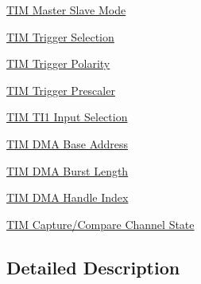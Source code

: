 \begin{DoxyCompactItemize}
\item 
\hyperlink{group___t_i_m___master___slave___mode}{T\+I\+M Master Slave Mode}
\item 
\hyperlink{group___t_i_m___trigger___selection}{T\+I\+M Trigger Selection}
\item 
\hyperlink{group___t_i_m___trigger___polarity}{T\+I\+M Trigger Polarity}
\item 
\hyperlink{group___t_i_m___trigger___prescaler}{T\+I\+M Trigger Prescaler}
\item 
\hyperlink{group___t_i_m___t_i1___selection}{T\+I\+M T\+I1 Input Selection}
\item 
\hyperlink{group___t_i_m___d_m_a___base__address}{T\+I\+M D\+M\+A Base Address}
\item 
\hyperlink{group___t_i_m___d_m_a___burst___length}{T\+I\+M D\+M\+A Burst Length}
\item 
\hyperlink{group___t_i_m___d_m_a___handle__index}{T\+I\+M D\+M\+A Handle Index}
\item 
\hyperlink{group___t_i_m___channel___c_c___state}{T\+I\+M Capture/\+Compare Channel State}
\end{DoxyCompactItemize}


\subsection{Detailed Description}
